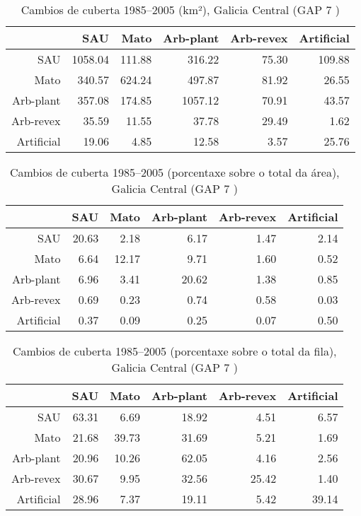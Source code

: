 \clearpage
\begin{table}[p]
\centering
\caption{Cambios de cuberta 1985--2005 (km²), Galicia Central (GAP 7 )} 
\label{TaboaContinxGAP7}
\begin{tabular}{rrrrrr}
  \hline
 & SAU & Mato & Arb-plant & Arb-revex & Artificial \\ 
  \hline
SAU & 1058.04 & 111.88 & 316.22 & 75.30 & 109.88 \\ 
  Mato & 340.57 & 624.24 & 497.87 & 81.92 & 26.55 \\ 
  Arb-plant & 357.08 & 174.85 & 1057.12 & 70.91 & 43.57 \\ 
  Arb-revex & 35.59 & 11.55 & 37.78 & 29.49 & 1.62 \\ 
  Artificial & 19.06 & 4.85 & 12.58 & 3.57 & 25.76 \\ 
   \hline
\end{tabular}
\end{table}
\begin{table}[p]
\centering
\caption{Cambios de cuberta 1985--2005 (porcentaxe sobre o total da área), Galicia Central (GAP 7 )} 
\label{TaboaContinxPTGAP7}
\begin{tabular}{rrrrrr}
  \hline
 & SAU & Mato & Arb-plant & Arb-revex & Artificial \\ 
  \hline
SAU & 20.63 & 2.18 & 6.17 & 1.47 & 2.14 \\ 
  Mato & 6.64 & 12.17 & 9.71 & 1.60 & 0.52 \\ 
  Arb-plant & 6.96 & 3.41 & 20.62 & 1.38 & 0.85 \\ 
  Arb-revex & 0.69 & 0.23 & 0.74 & 0.58 & 0.03 \\ 
  Artificial & 0.37 & 0.09 & 0.25 & 0.07 & 0.50 \\ 
   \hline
\end{tabular}
\end{table}
\begin{table}[p]
\centering
\caption{Cambios de cuberta 1985--2005 (porcentaxe sobre o total da fila), Galicia Central (GAP 7 )} 
\label{TaboaContinxPFGAP7}
\begin{tabular}{rrrrrr}
  \hline
 & SAU & Mato & Arb-plant & Arb-revex & Artificial \\ 
  \hline
SAU & 63.31 & 6.69 & 18.92 & 4.51 & 6.57 \\ 
  Mato & 21.68 & 39.73 & 31.69 & 5.21 & 1.69 \\ 
  Arb-plant & 20.96 & 10.26 & 62.05 & 4.16 & 2.56 \\ 
  Arb-revex & 30.67 & 9.95 & 32.56 & 25.42 & 1.40 \\ 
  Artificial & 28.96 & 7.37 & 19.11 & 5.42 & 39.14 \\ 
   \hline
\end{tabular}
\end{table}

